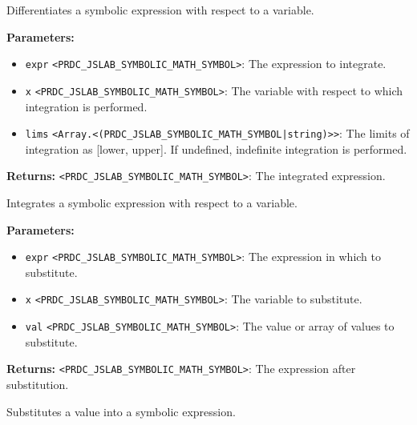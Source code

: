 \documentclass[12pt,a4paper]{article}
\begin{document}
\noindent Differentiates a symbolic expression with respect to a variable.

\vspace{5mm}
\noindent {}


\noindent \textbf{Parameters:}
\begin{itemize}
  \item \texttt{expr} \texttt{<PRDC\_JSLAB\_SYMBOLIC\_MATH\_SYMBOL>}: The expression to integrate.
  \item \texttt{x} \texttt{<PRDC\_JSLAB\_SYMBOLIC\_MATH\_SYMBOL>}: The variable with respect to which integration is performed.
  \item \texttt{lims} \texttt{<Array.<(PRDC\_JSLAB\_SYMBOLIC\_MATH\_SYMBOL|string)>>}: The limits of integration as [lower, upper]. If undefined, indefinite integration is performed.
\end{itemize}

\noindent \textbf{Returns:} \texttt{<PRDC\_JSLAB\_SYMBOLIC\_MATH\_SYMBOL>}: The integrated expression.

\noindent Integrates a symbolic expression with respect to a variable.

\vspace{5mm}
\noindent {}


\noindent \textbf{Parameters:}
\begin{itemize}
  \item \texttt{expr} \texttt{<PRDC\_JSLAB\_SYMBOLIC\_MATH\_SYMBOL>}: The expression in which to substitute.
  \item \texttt{x} \texttt{<PRDC\_JSLAB\_SYMBOLIC\_MATH\_SYMBOL>}: The variable to substitute.
  \item \texttt{val} \texttt{<PRDC\_JSLAB\_SYMBOLIC\_MATH\_SYMBOL>}: The value or array of values to substitute.
\end{itemize}

\noindent \textbf{Returns:} \texttt{<PRDC\_JSLAB\_SYMBOLIC\_MATH\_SYMBOL>}: The expression after substitution.

\noindent Substitutes a value into a symbolic expression.

\vspace{5mm}
\noindent {}
\end{document}
